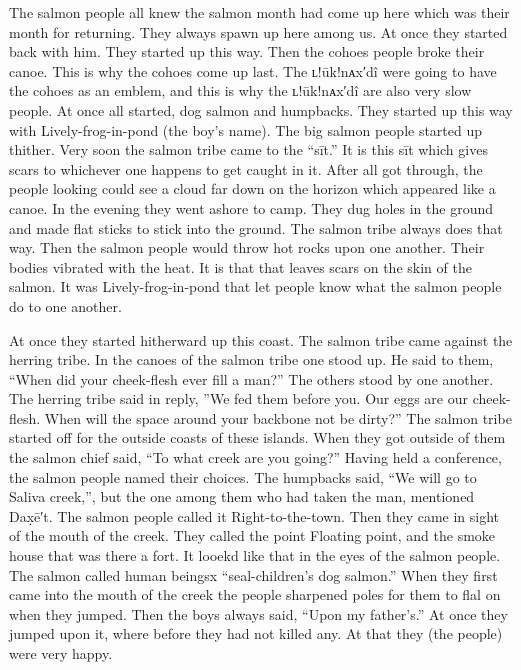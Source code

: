 The salmon people all knew the salmon month had come up here which was their month for returning.
They always spawn up here among us.
At once they started back with him.
They started up this way.
Then the cohoes people broke their canoe.
This is why the cohoes come up last.
The ʟ!ūk!nᴀx′dî were going to have the cohoes as an emblem, and this is why the ʟ!ūk!nᴀx′dî are also very slow people.
At once all started, dog salmon and humpbacks.
They started up this way with Lively-frog-in-pond (the boy’s name).
The big salmon people started up thither.
Very soon the salmon tribe came to the “sīt.” It is this sīt which gives scars to whichever one happens to get caught in it.
After all got through, the people looking could see a cloud far down on the horizon which appeared like a canoe.
In the evening they went ashore to camp.
They dug holes in the ground and made flat sticks to stick into the ground.
The salmon tribe always does that way.
Then the salmon people would throw hot rocks upon one another.
Their bodies vibrated with the heat.
It is that that leaves scars on the skin of the salmon.
It was Lively-frog-in-pond that let people know what the salmon people do to one another.

At once they started hitherward up this coast.
The salmon tribe came against the herring tribe.
In the canoes of the salmon tribe one stood up.
He said to them, “When did your cheek-flesh ever fill a man?” The others stood by one another.
The herring tribe said in reply, ”We fed them before you.
Our eggs are our cheek-flesh.
When will the space around your backbone not be dirty?” The salmon tribe started off for the outside coasts of these islands.
When they got outside of them the salmon chief said, “To what creek are you going?” Having held a conference, the salmon people named their choices.
The humpbacks said, “We will go to Saliva creek,”, but the one among them who had taken the man, mentioned Dax̣ē′t.
The salmon people called it Right-to-the-town.
Then they came in sight of the mouth of the creek.
They called the point Floating point, and the smoke house that was there a fort.
It looekd like that in the eyes of the salmon people.
The salmon called human beingsx “seal-children’s dog salmon.” When they first came into the mouth of the creek the people sharpened poles for them to flal on when they jumped.
Then the boys always said, “Upon my father’s.” At once they jumped upon it, where before they had not killed any.
At that they (the people) were very happy.

